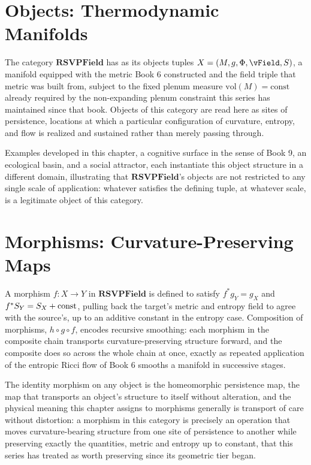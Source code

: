\chapter{Objects: Thermodynamic Manifolds}

The category $\mathbf{RSVPField}$ has as its objects tuples $X = (M, g, \PhiField, \vField, \SEntropy)$, a manifold equipped with the metric Book 6 constructed and the field triple that metric was built from, subject to the fixed plenum measure $\mathrm{vol}(M) = \text{const}$ already required by the non-expanding plenum constraint this series has maintained since that book. Objects of this category are read here as sites of persistence, locations at which a particular configuration of curvature, entropy, and flow is realized and sustained rather than merely passing through.

Examples developed in this chapter, a cognitive surface in the sense of Book 9, an ecological basin, and a social attractor, each instantiate this object structure in a different domain, illustrating that $\mathbf{RSVPField}$'s objects are not restricted to any single scale of application: whatever satisfies the defining tuple, at whatever scale, is a legitimate object of this category.

\chapter{Morphisms: Curvature-Preserving Maps}

A morphism $f: X \to Y$ in $\mathbf{RSVPField}$ is defined to satisfy $f^{*}g_Y = g_X$ and $f^{*}S_Y = S_X + \text{const}$, pulling back the target's metric and entropy field to agree with the source's, up to an additive constant in the entropy case. Composition of morphisms, $h \circ g \circ f$, encodes recursive smoothing: each morphism in the composite chain transports curvature-preserving structure forward, and the composite does so across the whole chain at once, exactly as repeated application of the entropic Ricci flow of Book 6 smooths a manifold in successive stages.

The identity morphism on any object is the homeomorphic persistence map, the map that transports an object's structure to itself without alteration, and the physical meaning this chapter assigns to morphisms generally is transport of care without distortion: a morphism in this category is precisely an operation that moves curvature-bearing structure from one site of persistence to another while preserving exactly the quantities, metric and entropy up to constant, that this series has treated as worth preserving since its geometric tier began.

